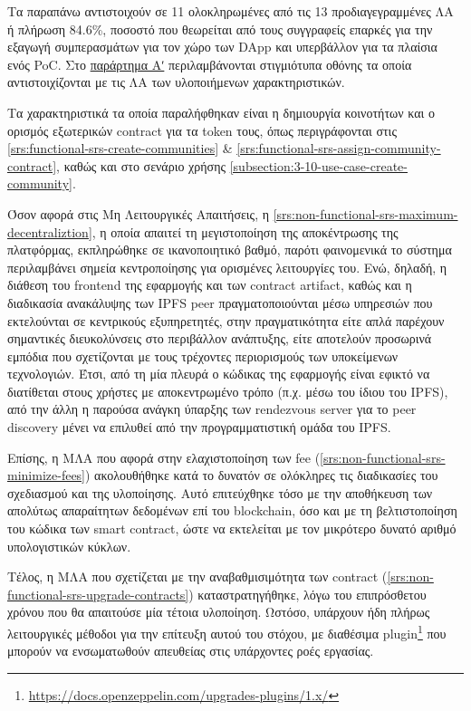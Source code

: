 Τα παραπάνω αντιστοιχούν σε 11 ολοκληρωμένες από τις 13 προδιαγεγραμμένες ΛΑ ή πλήρωση 84.6\%, ποσοστό που θεωρείται από τους συγγραφείς επαρκές για την εξαγωγή συμπερασμάτων για τον χώρο των DApp και υπερβάλλον για τα πλαίσια ενός PoC. Στο \hyperref[{appendix-a}]{παράρτημα Αʹ} περιλαμβάνονται στιγμιότυπα οθόνης τα οποία αντιστοιχίζονται με τις ΛΑ των υλοποιήμενων χαρακτηριστικών.

Τα χαρακτηριστικά τα οποία παραλήφθηκαν είναι η δημιουργία κοινοτήτων και ο ορισμός εξωτερικών contract για τα token τους, όπως περιγράφονται στις \ref{srs:functional-srs-create-communities} \& \ref{srs:functional-srs-assign-community-contract}, καθώς και στο σενάριο χρήσης \ref{subsection:3-10-use-case-create-community}.

Όσον αφορά στις Μη Λειτουργικές Απαιτήσεις, η \ref{srs:non-functional-srs-maximum-decentraliztion}, η οποία απαιτεί τη μεγιστοποίηση της αποκέντρωσης της πλατφόρμας, εκπληρώθηκε σε ικανοποιητικό βαθμό, παρότι φαινομενικά το σύστημα περιλαμβάνει σημεία κεντροποίησης για ορισμένες λειτουργίες του. Ενώ, δηλαδή, η διάθεση του frontend της εφαρμογής και των contract artifact, καθώς και η διαδικασία ανακάλυψης των IPFS peer πραγματοποιούνται μέσω υπηρεσιών που εκτελούνται σε κεντρικούς εξυπηρετητές, στην πραγματικότητα είτε απλά παρέχουν σημαντικές διευκολύνσεις στο περιβάλλον ανάπτυξης, είτε αποτελούν προσωρινά εμπόδια που σχετίζονται με τους τρέχοντες περιορισμούς των υποκείμενων τεχνολογιών. Έτσι, από τη μία πλευρά ο κώδικας της εφαρμογής είναι εφικτό να διατίθεται στους χρήστες με αποκεντρωμένο τρόπο (π.χ. μέσω του ίδιου του IPFS), από την άλλη η παρούσα ανάγκη ύπαρξης των rendezvous server για το peer discovery μένει να επιλυθεί από την προγραμματιστική ομάδα του IPFS.

Επίσης, η ΜΛΑ που αφορά στην ελαχιστοποίηση των fee (\ref{srs:non-functional-srs-minimize-fees}) ακολουθήθηκε κατά το δυνατόν σε ολόκληρες τις διαδικασίες του σχεδιασμού και της υλοποίησης. Αυτό επιτεύχθηκε τόσο με την αποθήκευση των απολύτως απαραίτητων δεδομένων επί του blockchain, όσο και με τη βελτιστοποίηση του κώδικα των smart contract, ώστε να εκτελείται με τον μικρότερο δυνατό αριθμό υπολογιστικών κύκλων.

Τέλος, η ΜΛΑ που σχετίζεται με την αναβαθμισιμότητα των contract (\ref{srs:non-functional-srs-upgrade-contracts}) καταστρατηγήθηκε, λόγω του επιπρόσθετου χρόνου που θα απαιτούσε μία τέτοια υλοποίηση. Ωστόσο, υπάρχουν ήδη πλήρως λειτουργικές μέθοδοι για την επίτευξη αυτού του στόχου, με διαθέσιμα plugin\footnote{\url{https://docs.openzeppelin.com/upgrades-plugins/1.x/}} που μπορούν να ενσωματωθούν απευθείας στις υπάρχοντες ροές εργασίας.

